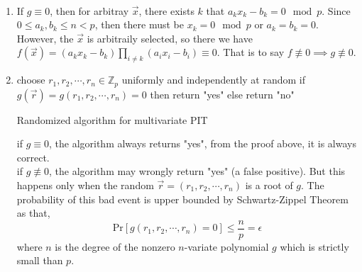 \documentclass[12pt]{article}
\newenvironment{solution}[2][Solution]{\begin{trivlist}
\item[\hskip \labelsep {\bfseries #1}\hskip \labelsep {\bfseries #2.}]}{\end{trivlist}}
\begin{document}
\begin{solution}{5}
    ~
    \begin{enumerate}
        \item If $g \equiv 0$, then for arbitray $\vec{x}$, there exists $k$ that $a_kx_k-b_k = 0 \mod{p}$. Since
        $0 \le a_k, b_k \le n < p$, then there must be $x_k = 0 \mod{p}$ or $a_k = b_k = 0$. However, the $\vec{x}$
        is arbitraily selected, so there we have $f(\vec{x}) = (a_kx_k - b_k)\prod_{i \neq k}(a_ix_i-b_i) \equiv 0$.
        That is to say $f \not \equiv 0 \implies g \not \equiv 0$.
        \item\begin{algorithm}[h]
            choose $r_1, r_2, \cdots, r_n \in \mathbb{Z}_p$ uniformly and independently at random\;
            if $g(\vec r) = g(r_1, r_2, \cdots, r_n) = 0$ then return "yes" else return "no" \;
            \caption{Randomized algorithm for multivariate PIT} %
        \end{algorithm}
        if $g \equiv 0$, the algorithm always returns "yes", from the proof above, it is always correct. \\
        if $g \not \equiv 0$, the algorithm may wrongly return "yes" (a false positive). But this happens only when the random
        $\vec r = (r_1, r_2, \cdots, r_n)$ is a root of $g$. The probability of this bad event is upper bounded by Schwartz-Zippel Theorem
        as that,
        \[\mathrm{Pr}[g(r_1, r_2, \cdots, r_n) = 0] \le \frac{n}{p} = \epsilon\]
        where $n$ is the degree of the nonzero $n$-variate polynomial $g$ which is strictly small than $p$.
    \end{enumerate}
\end{solution}
\end{document}
